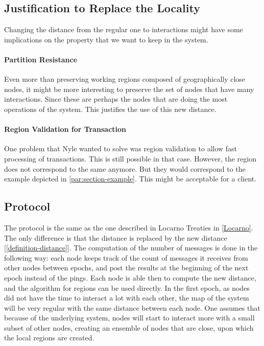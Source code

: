 \documentclass[a4paper,11pt,twoside=semi,openright]{report}
\begin{document}
\subsection{Justification to Replace the Locality}
Changing the distance from the regular one to interactions might have some
implications on the property that we want to keep in the system. 

\paragraph{Partition Resistance}
Even more than preserving working regions composed of geographically close
nodes, it might be more interesting to preserve the set of nodes that have many
interactions. Since these are perhaps the nodes that are doing the most
operations of the system. This justifies the use of this new distance.

\paragraph{Region Validation for Transaction}
One problem that Nyle wanted to solve was region validation to allow fast
processing of transactions. This is still possible in that case. However, the
region does not correspond to the same anymore. But they would correspond to
the example depicted in \autoref{par:section-example}. This might be acceptable
for a client. 

\subsection{Protocol}
The protocol is the same as the one described in Locarno Treaties in
\autoref{Locarno}. The only difference is that the distance is replaced by the
new distance [\autoref{definition-distance}]. The computation of the number of
messages is done in the following way: each node keeps track of the count
of messages it receives from other nodes between epochs, and post the results
at the beginning of the next epoch instead of the pings. Each node is able then
to compute the new distance, and the algorithm for regions can be used
directly. In the first epoch, as nodes did not have the time to interact a lot
with each other, the map of the system will be very regular with the same
distance between each node. One assumes that because of the underlying system,
nodes will start to interact more with a small subset of other nodes, creating
an ensemble of nodes that are close, upon which the local regions are created.
\end{document}

